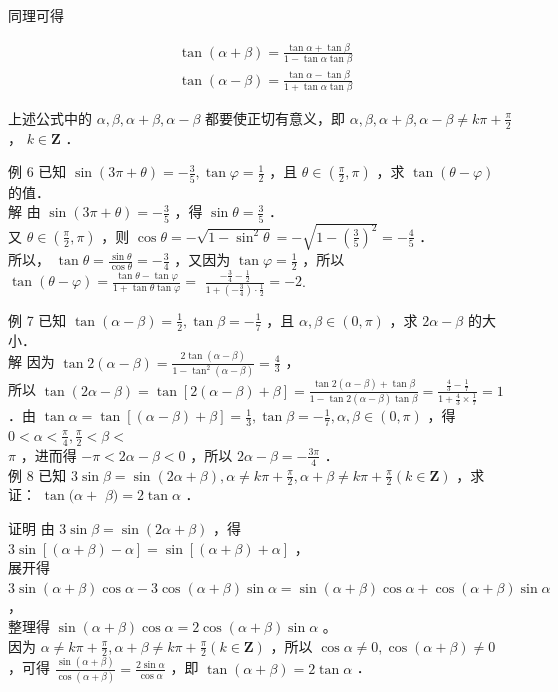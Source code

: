 \documentclass[10pt]{article}
\begin{document}
同理可得

\[
\begin{aligned}
& \tan (\alpha+\beta)=\frac{\tan \alpha+\tan \beta}{1-\tan \alpha \tan \beta} \\
& \tan (\alpha-\beta)=\frac{\tan \alpha-\tan \beta}{1+\tan \alpha \tan \beta}
\end{aligned}
\]

上述公式中的 \(\alpha, \beta, \alpha+\beta, \alpha-\beta\) 都要使正切有意义，即 \(\alpha, \beta, \alpha+\beta, \alpha-\beta \neq k \pi+\frac{\pi}{2}\) ， \(k \in \mathbf{Z}\) ．

例 6 已知 \(\sin (3 \pi+\theta)=-\frac{3}{5}, \tan \varphi=\frac{1}{2}\) ，且 \(\theta \in\left(\frac{\pi}{2}, \pi\right)\) ，求 \(\tan (\theta-\varphi)\) 的值．\\
解 由 \(\sin (3 \pi+\theta)=-\frac{3}{5}\) ，得 \(\sin \theta=\frac{3}{5}\) ．\\
又 \(\theta \in\left(\frac{\pi}{2}, \pi\right)\) ，则 \(\cos \theta=-\sqrt{1-\sin ^{2} \theta}=-\sqrt{1-\left(\frac{3}{5}\right)^{2}}=-\frac{4}{5}\) ．\\
所以， \(\tan \theta=\frac{\sin \theta}{\cos \theta}=-\frac{3}{4}\) ，又因为 \(\tan \varphi=\frac{1}{2}\) ，所以 \(\tan (\theta-\varphi)=\frac{\tan \theta-\tan \varphi}{1+\tan \theta \tan \varphi}=\) \(\frac{-\frac{3}{4}-\frac{1}{2}}{1+\left(-\frac{3}{4}\right) \cdot \frac{1}{2}}=-2\).

例 7 已知 \(\tan (\alpha-\beta)=\frac{1}{2}, \tan \beta=-\frac{1}{7}\) ，且 \(\alpha, \beta \in(0, \pi)\) ，求 \(2 \alpha-\beta\) 的大小．\\
解 因为 \(\tan 2(\alpha-\beta)=\frac{2 \tan (\alpha-\beta)}{1-\tan ^{2}(\alpha-\beta)}=\frac{4}{3}\) ，\\
所以 \(\tan (2 \alpha-\beta)=\tan [2(\alpha-\beta)+\beta]=\frac{\tan 2(\alpha-\beta)+\tan \beta}{1-\tan 2(\alpha-\beta) \tan \beta}=\frac{\frac{4}{3}-\frac{1}{7}}{1+\frac{4}{3} \times \frac{1}{7}}=1\) ．由 \(\tan \alpha=\tan [(\alpha-\beta)+\beta]=\frac{1}{3}, \tan \beta=-\frac{1}{7}, \alpha, \beta \in(0, \pi)\) ，得 \(0<\alpha<\frac{\pi}{4}, \frac{\pi}{2}<\beta<\)\\
\(\pi\) ，进而得 \(-\pi<2 \alpha-\beta<0\) ，所以 \(2 \alpha-\beta=-\frac{3 \pi}{4}\) ．\\
例 8 已知 \(3 \sin \beta=\sin (2 \alpha+\beta), \alpha \neq k \pi+\frac{\pi}{2}, \alpha+\beta \neq k \pi+\frac{\pi}{2}(k \in \mathbf{Z})\) ，求证： \(\tan (\alpha+\) \(\beta)=2 \tan \alpha\) ．

证明 由 \(3 \sin \beta=\sin (2 \alpha+\beta)\) ，得 \(3 \sin [(\alpha+\beta)-\alpha]=\sin [(\alpha+\beta)+\alpha]\) ，\\
展开得 \(3 \sin (\alpha+\beta) \cos \alpha-3 \cos (\alpha+\beta) \sin \alpha=\sin (\alpha+\beta) \cos \alpha+\cos (\alpha+\beta) \sin \alpha\) ，\\
整理得 \(\sin (\alpha+\beta) \cos \alpha=2 \cos (\alpha+\beta) \sin \alpha\) 。\\
因为 \(\alpha \neq k \pi+\frac{\pi}{2}, \alpha+\beta \neq k \pi+\frac{\pi}{2}(k \in \mathbf{Z})\) ，所以 \(\cos \alpha \neq 0, \cos (\alpha+\beta) \neq 0\) ，可得 \(\frac{\sin (\alpha+\beta)}{\cos (\alpha+\beta)}=\frac{2 \sin \alpha}{\cos \alpha}\) ，即 \(\tan (\alpha+\beta)=2 \tan \alpha\) ．
\end{document}

